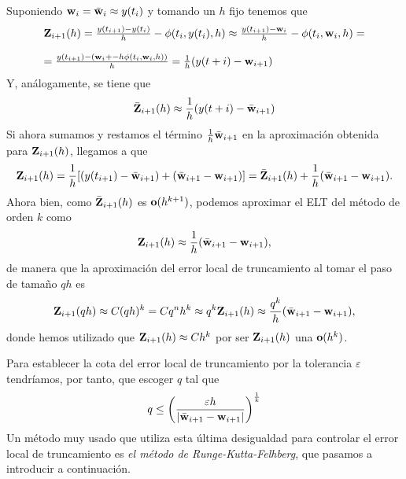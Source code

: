 Suponiendo $\vb{w}_i = \bar{\vb{w}}_i \approx y(t_i)$ y tomando un $h$ fijo tenemos que
\begin{equation*}
\begin{array}{l}
    \vb{Z}_{i+1}(h) = \frac{y(t_{i+1}) - y(t_i)}{h} - \phi(t_i, y(t_i), h) \approx  \frac{y(t_{i+1}) - \vb{w}_i}{h} - \phi(t_i, \vb{w}_i, h) =\\
    \\
     =\frac{y(t_{i+1}) - (\vb{w}_i+ - h\phi(t_i, \vb{w}_i, h))}{h} = \frac{1}{h}(y(t+i)-\vb{w}_{i+1})
\end{array}
\end{equation*}
Y, análogamente, se tiene que 
\begin{equation*}
    \bar{\vb{Z}}_{i+1}(h) \approx \frac{1}{h}(y(t+i)-\bar{\vb{w}}_{i+1})
\end{equation*}
Si ahora sumamos y restamos el término $\frac{1}{h}\bar{\vb{w}}_{i+1}$
en la aproximación obtenida para $\vb{Z}_{i+1}(h)$,
llegamos a que
\begin{equation*}
    \vb{Z}_{i+1}(h) = \frac{1}{h}[(y(t_{i+1})-\bar{\vb{w}}_{i+1}) + (\bar{\vb{w}}_{i+1} - \vb{w}_{i+1})] = \bar{\vb{Z}}_{i+1}(h) + \frac{1}{h}(\bar{\vb{w}}_{i+1}-\vb{w}_{i+1}).
\end{equation*}
Ahora bien, como $\bar{\vb{Z}}_{i+1}(h)$ es $\vb{o}(h^{k+1})$,
podemos aproximar el ELT del método de orden $k$ como
\begin{equation*}
\vb{Z}_{i+1}(h) \approx \frac{1}{h}(\bar{\vb{w}}_{i+1}-\vb{w}_{i+1}),
\end{equation*}
de manera que la aproximación del error local de truncamiento
al tomar el paso de tamaño $qh$ es
\begin{equation*}
    \vb{Z}_{i+1}(qh)\approx C(qh)^k = Cq^nh^k \approx q^k \vb{Z}_{i+1}(h) \approx \frac{q^k}{h}(\bar{\vb{w}}_{i+1}-\vb{w}_{i+1}),
\end{equation*}
donde hemos utilizado que $\vb{Z}_{i+1}(h) \approx Ch^k$
por ser $\vb{Z}_{i+1}(h)$ una $\vb{o}(h^k)$.

Para establecer la cota del error local de truncamiento
por la tolerancia $\varepsilon$ tendríamos, por tanto,
que escoger $q$ tal que
\begin{equation*}
    q \leq \left(\frac{\varepsilon h}{|\bar{\vb{w}}_{i+1} - \vb{w}_{i+1}|}\right)^{\frac{1}{k}}
\end{equation*}
Un método muy usado que utiliza esta última desigualdad para
controlar el error local de truncamiento es
\emph{el método de Runge-Kutta-Felhberg},
que pasamos a introducir a continuación.

